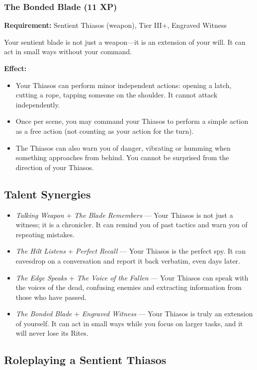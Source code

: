 \subsubsection{The Bonded Blade (11 XP)}

\textbf{Requirement:} Sentient Thiasos (weapon), Tier III+, Engraved Witness

Your sentient blade is not just a weapon—it is an extension of your will. It can act in small ways without your command.

\textbf{Effect:}
\begin{itemize}
\item Your Thiasos can perform minor independent actions: opening a latch, cutting a rope, tapping someone on the shoulder. It cannot attack independently.
\item Once per scene, you may command your Thiasos to perform a simple action as a free action (not counting as your action for the turn).
\item The Thiasos can also warn you of danger, vibrating or humming when something approaches from behind. You cannot be surprised from the direction of your Thiasos.
\end{itemize}

\subsection{Talent Synergies}

\begin{itemize}
\item \textit{Talking Weapon} + \textit{The Blade Remembers} — Your Thiasos is not just a witness; it is a chronicler. It can remind you of past tactics and warn you of repeating mistakes.
\item \textit{The Hilt Listens} + \textit{Perfect Recall} — Your Thiasos is the perfect spy. It can eavesdrop on a conversation and report it back verbatim, even days later.
\item \textit{The Edge Speaks} + \textit{The Voice of the Fallen} — Your Thiasos can speak with the voices of the dead, confusing enemies and extracting information from those who have passed.
\item \textit{The Bonded Blade} + \textit{Engraved Witness} — Your Thiasos is truly an extension of yourself. It can act in small ways while you focus on larger tasks, and it will never lose its Rites.
\end{itemize}

\subsection{Roleplaying a Sentient Thiasos}

